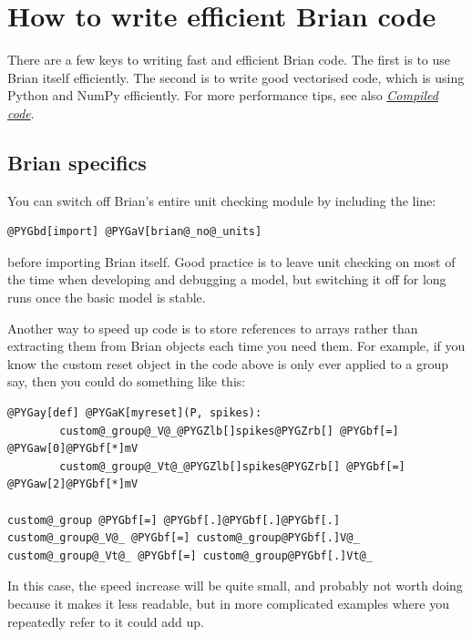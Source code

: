 \documentclass[letterpaper,10pt,english]{manual}
\begin{document}
\hypertarget{index-3}{}\section{How to write efficient Brian code}

There are a few keys to writing fast and efficient Brian code. The
first is to use Brian itself efficiently. The second is to write
good vectorised code, which is using Python and NumPy efficiently.
For more performance tips, see also \hyperlink{compiled-code}{\emph{Compiled code}}.


\subsection{Brian specifics}

You can switch off Brian's entire unit checking module
by including the line:

\begin{Verbatim}[commandchars=@\[\]]
@PYGbd[import] @PYGaV[brian@_no@_units]
\end{Verbatim}

before importing Brian itself. Good practice is to leave unit checking
on most of the time when developing and debugging a model, but
switching it off for long runs once the basic model is stable.

Another way to speed up code is to store references to arrays rather
than extracting them from Brian objects each time you need them. For
example, if you know the custom reset object in the code above is
only ever applied to a group  say, then you could
do something like this:

\begin{Verbatim}[commandchars=@\[\]]
@PYGay[def] @PYGaK[myreset](P, spikes):
        custom@_group@_V@_@PYGZlb[]spikes@PYGZrb[] @PYGbf[=] @PYGaw[0]@PYGbf[*]mV
        custom@_group@_Vt@_@PYGZlb[]spikes@PYGZrb[] @PYGbf[=] @PYGaw[2]@PYGbf[*]mV

custom@_group @PYGbf[=] @PYGbf[.]@PYGbf[.]@PYGbf[.]
custom@_group@_V@_ @PYGbf[=] custom@_group@PYGbf[.]V@_
custom@_group@_Vt@_ @PYGbf[=] custom@_group@PYGbf[.]Vt@_
\end{Verbatim}

In this case, the speed increase will be quite small, and probably
not worth doing because it makes it less readable, but in more
complicated examples where you repeatedly refer to 
it could add up.
\hypertarget{efficiency-vectorisation}{}
\end{document}
